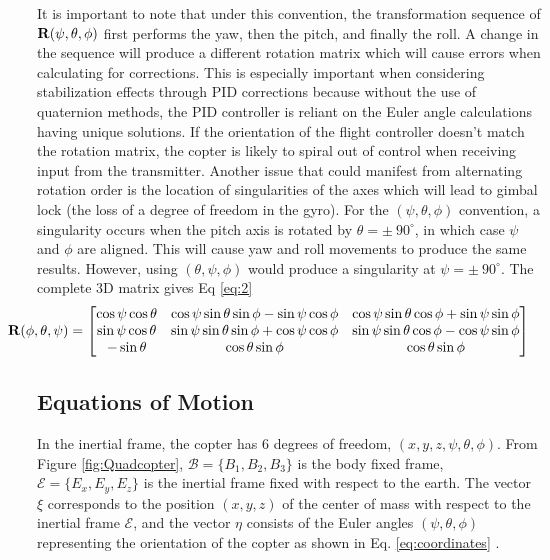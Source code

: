 \documentclass[11pt]{ucthesis}
\begin{document}
It is important to note that under this convention, the transformation sequence of $\bold{R}(\psi,\theta,\phi)$ first performs the yaw, then the pitch, and finally the roll. A change in the sequence will produce a different rotation matrix which will cause errors when calculating for corrections. This is especially important when considering stabilization effects through PID corrections because without the use of quaternion methods, the PID controller is reliant on the Euler angle calculations having unique solutions. If the orientation of the flight controller doesn't match the rotation matrix, the copter is likely to spiral out of control when receiving input from the transmitter. Another issue that could manifest from alternating rotation order is the location of singularities of the axes which will lead to gimbal lock (the loss of a degree of freedom in the gyro). For the $(\psi,\theta,\phi)$ convention, a singularity occurs when the pitch axis is rotated by $\theta = \pm \:90^\circ$, in which case $\psi$ and $\phi$ are aligned. This will cause yaw and roll movements to produce the same results. However, using $(\theta,\psi,\phi)$ would produce a singularity at $\psi = \pm \:90^\circ$. The complete 3D matrix gives Eq \ref{eq:2} \cite{fantoni2002non}
\begin{equation}\label{eq:2}
\hspace*{-1cm} %
\bold{R}(\phi,\theta,\psi) = \begin{bmatrix}
\cos\psi\cos\theta & \cos\psi\sin\theta\sin\phi - \sin\psi\cos\phi & \cos\psi\sin\theta\cos\phi + \sin\psi\sin\phi\\
\sin\psi\cos\theta & \sin\psi\sin\theta\sin\phi + \cos\psi\cos\phi & \sin\psi\sin\theta\cos\phi - \cos\psi\sin\phi\\
-\sin\theta & \cos\theta\sin\phi & \cos\theta\sin\phi
\end{bmatrix}
\end{equation}

\subsection{Equations of Motion}
In the inertial frame, the copter has 6 degrees of freedom, $(x,y,z,\psi,\theta,\phi)$. From Figure \ref{fig:Quadcopter}, $\mathscr{B} = \{B_1,B_2,B_3\}$ is the body fixed frame, $\mathscr{E} = \{E_x,E_y,E_z\}$ is the inertial frame fixed with respect to the earth. The vector $\xi$ corresponds to the position $(x,y,z)$ of the center of mass with respect to the inertial frame  $\mathscr{E}$, and the vector $\eta$ consists of the Euler angles $(\psi,\theta,\phi)$ representing the orientation of the copter as shown in Eq. \ref{eq:coordinates} \cite{garcia2006modelling}.
\end{document}
